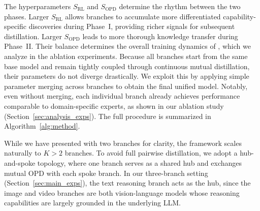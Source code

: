 The hyperparameters $S_{\mathrm{RL}}$ and $S_{\mathrm{OPD}}$ determine the rhythm between the two phases. Larger $S_{\mathrm{RL}}$ allows branches to accumulate more differentiated capability-specific discoveries during Phase~I, providing richer signals for subsequent distillation. Larger $S_{\mathrm{OPD}}$ leads to more thorough knowledge transfer during Phase~II. Their balance determines the overall training dynamics of \method, which we analyze in the ablation experiments. Because all branches start from the same base model and remain tightly coupled through continuous mutual distillation, their parameters do not diverge drastically. We exploit this by applying simple parameter merging across branches to obtain the final unified model. Notably, even without merging, each individual branch already achieves performance comparable to domain-specific experts, as shown in our ablation study (Section~\ref{sec:analysis_exps}). The full procedure is summarized in Algorithm~\ref{alg:method}.

While we have presented \method with two branches for clarity, the framework scales naturally to $K > 2$ branches. To avoid full pairwise distillation, we adopt a hub-and-spoke topology, where one branch serves as a shared hub and exchanges mutual OPD with each spoke branch. In our three-branch setting (Section~\ref{sec:main_exps}), the text reasoning branch acts as the hub, since the image and video branches are both vision-language models whose reasoning capabilities are largely grounded in the underlying LLM.

